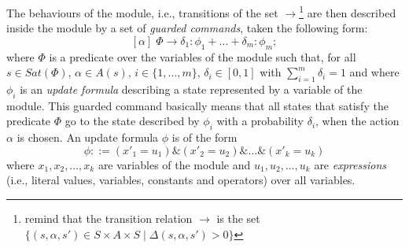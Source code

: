 The behaviours of the module, i.e., transitions of the set $\rightarrow$\footnote{remind that the transition relation $\rightarrow$ is the set $\{ (s, \alpha, s') \in S \times A \times S \; | \; \Delta(s, \alpha, s') > 0 \}$} are then described
inside the module by a set of \textit{guarded commands}, taken the following form:
\[
  [\alpha] \; \Phi \rightarrow \delta_1: \phi_1 + \dots + \delta_m: \phi_m;
\]
where $\Phi$ is a predicate over the variables of the module such that, for all $s \in Sat(\Phi)$, $\alpha \in A(s)$, $i \in \{1, \dots, m\}$, $\delta_i \in [0, 1]$ with $\sum_{i=1}^m \delta_i = 1$ and where $\phi_i$ is an \textit{update formula} describing a state represented by a variable of the module. This guarded command basically means that all states that satisfy the predicate $\Phi$ go to the state  described by $\phi_i$ with a probability $\delta_i$, when the action $\alpha$ is chosen.
An update formula $\phi$ is of the form
\[\phi::=(x'_1=u_1) \& (x'_2=u_2) \& \dots \& (x'_k=u_k)\]
where $x_1, x_2, \dots, x_k$ are variables of the module and $u_1, u_2, \dots, u_k$ are \textit{expressions} (i.e., literal values, variables, constants and operators) over all variables.
